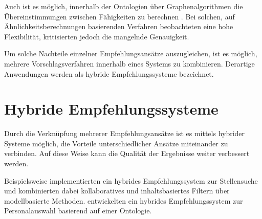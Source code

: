 Auch ist es möglich, innerhalb der Ontologien über Graphenalgorithmen die Übereinstimmungen zwischen Fähigkeiten zu berechnen \cite[S. 1ff.]{balachander:2018}. Bei solchen, auf Ähnlichkeitsberechnungen basierenden Verfahren beobachteten \textcite[S. 4]{bianchini:2008} eine hohe Flexibilität, kritisierten jedoch die mangelnde Genauigkeit.

Um solche Nachteile einzelner Empfehlungsansätze auszugleichen, ist es möglich, mehrere Vorschlagsverfahren innerhalb eines Systems zu kombinieren. Derartige Anwendungen werden als hybride Empfehlungssysteme bezeichnet. \cite[S. 200]{recommenderSystems:2016}

\section{Hybride Empfehlungssysteme}
\label{ch:empfehlungssysteme:hybrideEmpfehlungssysteme}
Durch die Verknüpfung mehrerer Empfehlungsansätze ist es mittels hybrider Systeme möglich, die Vorteile unterschiedlicher Ansätze miteinander zu verbinden. Auf diese Weise kann die Qualität der Ergebnisse weiter verbessert werden. \cite[S. 199ff.]{recommenderSystems:2016}\cite[S. 8]{malinowski:2008}

Beispielsweise implementierten \textcite[S. 1ff.]{combiningCbAndCFCostSensitiveApproach:2017} ein hybrides Empfehlungssystem zur Stellensuche und kombinierten dabei kollaboratives und inhaltsbasiertes Filtern über modellbasierte Methoden. \textcite[S. 1ff.]{mohamed:2018} entwickelten ein hybrides Empfehlungssystem zur Personalauswahl basierend auf einer Ontologie.

